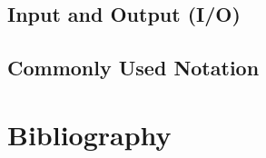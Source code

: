 %

\chapter{Input and Output (I/O)}
\label{ch:appendix_io}
\renewcommand{\dir}{dg}


\chapter{Commonly Used Notation}
\label{ch:notation}
\renewcommand{\dir}{appendix}


\part{Bibliography}


